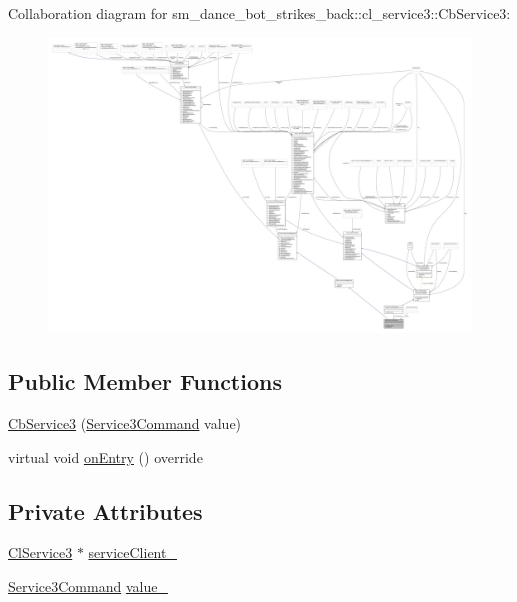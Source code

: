 Collaboration diagram for sm\+\_\+dance\+\_\+bot\+\_\+strikes\+\_\+back\+:\+:cl\+\_\+service3\+:\+:Cb\+Service3\+:
\nopagebreak
\begin{figure}[H]
\begin{center}
\leavevmode
\includegraphics[width=350pt]{classsm__dance__bot__strikes__back_1_1cl__service3_1_1CbService3__coll__graph}
\end{center}
\end{figure}
\subsection*{Public Member Functions}
\begin{DoxyCompactItemize}
\item 
\hyperlink{classsm__dance__bot__strikes__back_1_1cl__service3_1_1CbService3_a2d571bbec8f1d3d14a0e31446d3633b7}{Cb\+Service3} (\hyperlink{namespacesm__dance__bot__strikes__back_1_1cl__service3_ac2ccf5d911840620cf8d0443c29d8b6b}{Service3\+Command} value)
\item 
virtual void \hyperlink{classsm__dance__bot__strikes__back_1_1cl__service3_1_1CbService3_a09a2fda38973e1e3915b63a47ca67ed1}{on\+Entry} () override
\end{DoxyCompactItemize}
\subsection*{Private Attributes}
\begin{DoxyCompactItemize}
\item 
\hyperlink{classsm__dance__bot__strikes__back_1_1cl__service3_1_1ClService3}{Cl\+Service3} $\ast$ \hyperlink{classsm__dance__bot__strikes__back_1_1cl__service3_1_1CbService3_ae96f1d34aa0ab6b9bc7099c5c0e512de}{service\+Client\+\_\+}
\item 
\hyperlink{namespacesm__dance__bot__strikes__back_1_1cl__service3_ac2ccf5d911840620cf8d0443c29d8b6b}{Service3\+Command} \hyperlink{classsm__dance__bot__strikes__back_1_1cl__service3_1_1CbService3_a76973df60e0e3ed7d7c270d0701b8f9d}{value\+\_\+}
\end{DoxyCompactItemize}
